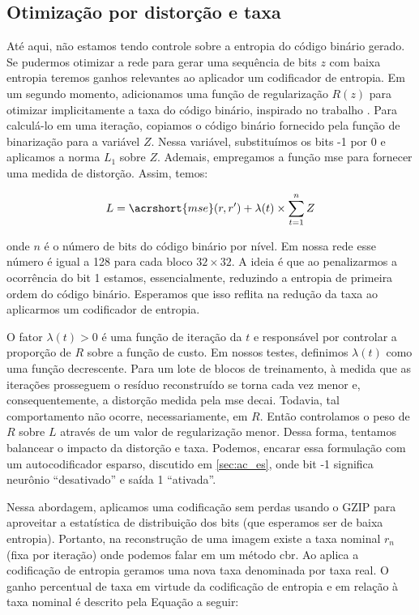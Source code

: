 \subsection{Otimização por distorção e taxa}

Até aqui, não estamos tendo controle sobre a entropia do código binário gerado. Se pudermos otimizar a rede para gerar uma sequência de bits $z$ com baixa entropia teremos ganhos relevantes ao aplicador um codificador de entropia. Em um segundo momento, adicionamos uma função de regularização $R(z)$ para otimizar implicitamente a taxa do código binário, inspirado no trabalho \cite{zhao1901cae}. 
Para calculá-lo em uma iteração, copiamos o código binário fornecido pela função de binarização  para a variável $Z$. Nessa variável, substituímos os bits -1 por 0 e aplicamos a norma $L_1$ sobre $Z$. Ademais, empregamos a função \acrshort{mse} para fornecer uma medida de distorção. Assim, temos:

\begin{equation}
\label{eq:rdo}
L = \acrshort{mse}(r,r') + \lambda(t) \times \sum_{t=1}^{n} Z 
\end{equation}


onde $n$ é o número de bits do código binário por nível. Em nossa rede esse número é igual a 128 para cada bloco $32 \times 32$. A ideia é que ao penalizarmos a ocorrência do bit 1 estamos, essencialmente, reduzindo a entropia de primeira ordem do código binário. Esperamos que isso reflita na redução da taxa ao aplicarmos um codificador de entropia.   

O fator $\lambda(t)>0$ é uma função de iteração da $t$ e responsável por controlar a proporção de $R$ sobre a função de custo. Em nossos testes, definimos $\lambda(t)$ como uma função decrescente. Para um lote de blocos de treinamento, à medida que as iterações prosseguem o resíduo reconstruído se torna cada vez menor e, consequentemente, a distorção medida pela \acrshort{mse} decai. Todavia, tal comportamento não ocorre, necessariamente, em $R$. Então controlamos o peso de $R$ sobre  $L$ através de um valor de regularização menor. Dessa forma, tentamos balancear o impacto da distorção e taxa. Podemos, encarar essa formulação com um autocodificador esparso, discutido em \ref{sec:ac_es}, onde bit -1 significa neurônio ``desativado'' e saída 1 ``ativada''. 

Nessa abordagem, aplicamos uma codificação sem perdas usando o GZIP \cite{sayood2017introduction} para aproveitar a estatística de distribuição dos bits (que esperamos ser de baixa entropia). Portanto, na reconstrução de uma imagem existe a taxa nominal $r_n$ (fixa por iteração) onde podemos falar em um método \gls{cbr}. Ao aplica a codificação de entropia geramos uma nova taxa denominada por taxa real.  O ganho percentual de taxa em virtude da codificação de entropia e em relação à taxa nominal é descrito pela Equação a seguir:

